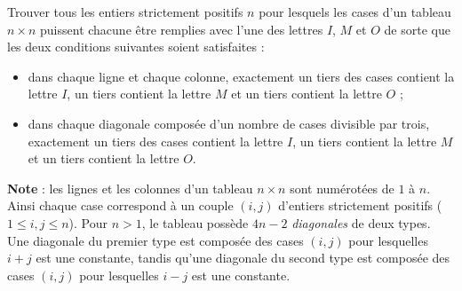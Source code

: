 Trouver tous les entiers strictement positifs $n$ pour lesquels les cases d'un tableau $n \times n$ puissent
chacune être remplies avec l'une des lettres $I$, $M$ et $O$ de sorte que les deux conditions suivantes soient
satisfaites :
\begin{itemize}
  \item dans chaque ligne et chaque colonne, exactement un tiers des cases contient la lettre $I$, un tiers
  contient la lettre $M$ et un tiers contient la lettre $O$ ;
  \item dans chaque diagonale composée d'un nombre de cases divisible par trois, exactement un tiers des cases
  contient la lettre $I$, un tiers contient la lettre $M$ et un tiers contient la lettre $O$.
\end{itemize}

\textbf{Note} : les lignes et les colonnes d'un tableau $n \times n$ sont numérotées de $1$ à $n$. Ainsi
chaque case correspond à un couple $(i, j)$ d'entiers strictement positifs ($1 \leq i, j \leq n$). Pour
$n > 1$, le tableau possède $4n - 2$ \emph{diagonales} de deux types. Une diagonale du premier type est
composée des cases $(i, j)$ pour lesquelles $i + j$ est une constante, tandis qu'une diagonale du second type
est composée des cases $(i, j)$ pour lesquelles $i - j$ est une constante.
